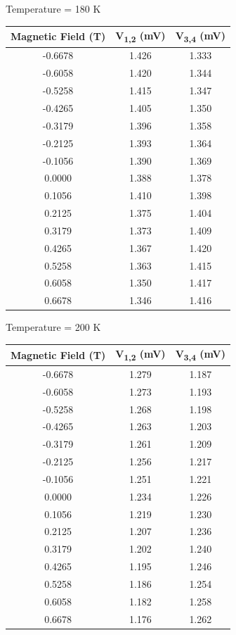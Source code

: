 \documentclass[twocolumn]{article}
\begin{document}
\begin{minipage}{\linewidth}
\Centering
Temperature = 180 K
\begin{tabular}{|c|c|c|}
\hline
Magnetic Field (T) & V\textsubscript{1,2} (mV) & V\textsubscript{3,4} (mV) \\ \hline
-0.6678 & 1.426 & 1.333 \\ \hline
-0.6058 & 1.420 & 1.344 \\ \hline
-0.5258 & 1.415 & 1.347 \\ \hline
-0.4265 & 1.405 & 1.350 \\ \hline
-0.3179 & 1.396 & 1.358 \\ \hline
-0.2125 & 1.393 & 1.364 \\ \hline
-0.1056 & 1.390 & 1.369 \\ \hline
0.0000 & 1.388 & 1.378 \\ \hline
0.1056 & 1.410 & 1.398 \\ \hline
0.2125 & 1.375 & 1.404 \\ \hline
0.3179 & 1.373 & 1.409 \\ \hline
0.4265 & 1.367 & 1.420 \\ \hline
0.5258 & 1.363 & 1.415 \\ \hline
0.6058 & 1.350 & 1.417 \\ \hline
0.6678 & 1.346 & 1.416 \\ \hline
\end{tabular}
\end{minipage}
\begin{minipage}{\linewidth}
\Centering
Temperature = 200 K
\begin{tabular}{|c|c|c|}
\hline
Magnetic Field (T) & V\textsubscript{1,2} (mV) & V\textsubscript{3,4} (mV) \\ \hline
-0.6678 & 1.279 & 1.187 \\ \hline
-0.6058 & 1.273 & 1.193 \\ \hline
-0.5258 & 1.268 & 1.198 \\ \hline
-0.4265 & 1.263 & 1.203 \\ \hline
-0.3179 & 1.261 & 1.209 \\ \hline
-0.2125 & 1.256 & 1.217 \\ \hline
-0.1056 & 1.251 & 1.221 \\ \hline
0.0000 & 1.234 & 1.226 \\ \hline
0.1056 & 1.219 & 1.230 \\ \hline
0.2125 & 1.207 & 1.236 \\ \hline
0.3179 & 1.202 & 1.240 \\ \hline
0.4265 & 1.195 & 1.246 \\ \hline
0.5258 & 1.186 & 1.254 \\ \hline
0.6058 & 1.182 & 1.258 \\ \hline
0.6678 & 1.176 & 1.262 \\ \hline
\end{tabular}
\end{minipage}
\end{document}

